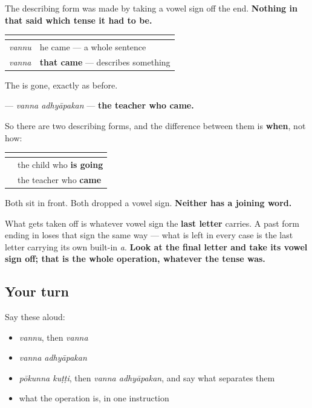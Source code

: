 \begin{grammarlens}[title={Grammar Lens: the rule was never about the present}]
The describing form was made by taking a vowel sign off the end. \textbf{Nothing in that said which tense it had to be.}

\noindent
\begin{tabularx}{\linewidth}{@{}>{\raggedright\arraybackslash}X>{\raggedright\arraybackslash}X@{}}
\toprule
\textbf{} & \textbf{} \\
\midrule
\textbf{\ml{വന്നു}} \emph{vannu} & he came — a whole sentence \\
\textbf{\ml{വന്ന}} \emph{vanna} & \textbf{that came} — describes something \\
\bottomrule
\end{tabularx}

The \textbf{} is gone, exactly as before.

\textbf{ } — \emph{vanna adhyāpakan} — \textbf{the teacher who came.}

So there are two describing forms, and the difference between them is \textbf{when}, not how:

\noindent
\begin{tabularx}{\linewidth}{@{}>{\raggedright\arraybackslash}X>{\raggedright\arraybackslash}X@{}}
\toprule
\textbf{} & \textbf{} \\
\midrule
\textbf{\ml{പോകുന്ന} \ml{കുട്ടി}} & the child who \textbf{is going} \\
\textbf{\ml{വന്ന} \ml{അധ്യാപകൻ}} & the teacher who \textbf{came} \\
\bottomrule
\end{tabularx}

Both sit in front. Both dropped a vowel sign. \textbf{Neither has a joining word.}

What gets taken off is whatever vowel sign the \textbf{last letter} carries. A past form ending in \textbf{} loses that sign the same way — what is left in every case is the last letter carrying its own built-in \emph{a}. \textbf{Look at the final letter and take its vowel sign off; that is the whole operation, whatever the tense was.}
\end{grammarlens}

\subsection*{Your turn}
Say these aloud:

\begin{itemize}
\raggedright
  \item \emph{vannu}, then \emph{vanna}
  \item \emph{vanna adhyāpakan}
  \item \emph{pōkunna kuṭṭi}, then \emph{vanna adhyāpakan}, and say what separates them
  \item what the operation is, in one instruction
\end{itemize}

